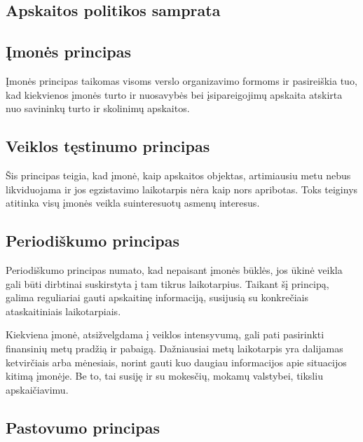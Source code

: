 \subsection{Apskaitos politikos samprata}


\subsection{Įmonės principas}


Įmonės principas taikomas visoms verslo organizavimo formoms ir
pasireiškia tuo, kad kiekvienos įmonės turto ir nuosavybės bei
įsipareigojimų apskaita atskirta nuo savininkų turto ir skolinimų
apskaitos.

\subsection{Veiklos tęstinumo principas}


Šis principas teigia, kad įmonė, kaip apskaitos objektas, artimiausiu
metu nebus likviduojama ir jos egzistavimo laikotarpis nėra kaip
nors apribotas. Toks teiginys atitinka visų įmonės veikla suinteresuotų
asmenų interesus.

\subsection{Periodiškumo principas}


Periodiškumo principas numato, kad nepaisant įmonės būklės, jos
ūkinė veikla gali būti dirbtinai suskirstyta į tam tikrus laikotarpius.
Taikant šį principą, galima reguliariai gauti apskaitinę informaciją,
susijusią su konkrečiais ataskaitiniais laikotarpiais.


Kiekviena įmonė, atsižvelgdama į veiklos intensyvumą, gali pati
pasirinkti finansinių metų pradžią ir pabaigą. Dažniausiai metų
laikotarpis yra dalijamas ketvirčiais arba mėnesiais, norint
gauti kuo daugiau informacijos apie situacijos kitimą įmonėje.
Be to, tai susiję ir su mokesčių, mokamų valstybei, tiksliu
apskaičiavimu.

\subsection{Pastovumo principas}

